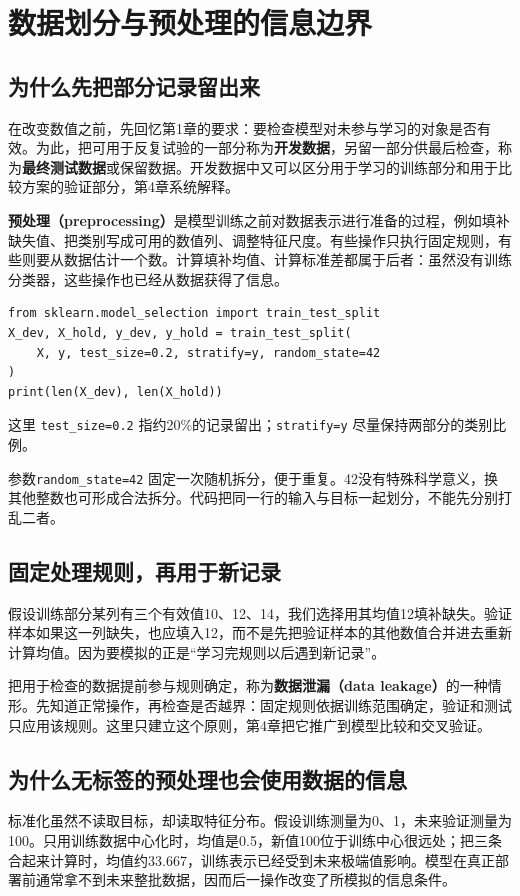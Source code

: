 \section{数据划分与预处理的信息边界}
\subsection{为什么先把部分记录留出来}
在改变数值之前，先回忆第1章的要求：要检查模型对未参与学习的对象是否有效。为此，把可用于反复试验的一部分称为\textbf{开发数据}，另留一部分供最后检查，称为\textbf{最终测试数据}或保留数据。开发数据中又可以区分用于学习的训练部分和用于比较方案的验证部分，第4章系统解释。

\textbf{预处理（preprocessing）}是模型训练之前对数据表示进行准备的过程，例如填补缺失值、把类别写成可用的数值列、调整特征尺度。有些操作只执行固定规则，有些则要从数据估计一个数。计算填补均值、计算标准差都属于后者：虽然没有训练分类器，这些操作也已经从数据获得了信息。

\begin{lstlisting}[caption={先确定开发部分和最终保留部分}]
from sklearn.model_selection import train_test_split
X_dev, X_hold, y_dev, y_hold = train_test_split(
    X, y, test_size=0.2, stratify=y, random_state=42
)
print(len(X_dev), len(X_hold))
\end{lstlisting}
这里 \texttt{test\_size=0.2} 指约20\%的记录留出；\texttt{stratify=y} 尽量保持两部分的类别比例。

\noindent 参数\texttt{random\_state=42} 固定一次随机拆分，便于重复。42没有特殊科学意义，换其他整数也可形成合法拆分。代码把同一行的输入与目标一起划分，不能先分别打乱二者。

\subsection{固定处理规则，再用于新记录}
假设训练部分某列有三个有效值10、12、14，我们选择用其均值12填补缺失。验证样本如果这一列缺失，也应填入12，而不是先把验证样本的其他数值合并进去重新计算均值。因为要模拟的正是“学习完规则以后遇到新记录”。

把用于检查的数据提前参与规则确定，称为\textbf{数据泄漏（data leakage）}的一种情形。先知道正常操作，再检查是否越界：固定规则依据训练范围确定，验证和测试只应用该规则。这里只建立这个原则，第4章把它推广到模型比较和交叉验证。

\subsection{为什么无标签的预处理也会使用数据的信息}
标准化虽然不读取目标，却读取特征分布。假设训练测量为0、1，未来验证测量为100。只用训练数据中心化时，均值是0.5，新值100位于训练中心很远处；把三条合起来计算时，均值约33.667，训练表示已经受到未来极端值影响。模型在真正部署前通常拿不到未来整批数据，因而后一操作改变了所模拟的信息条件。


